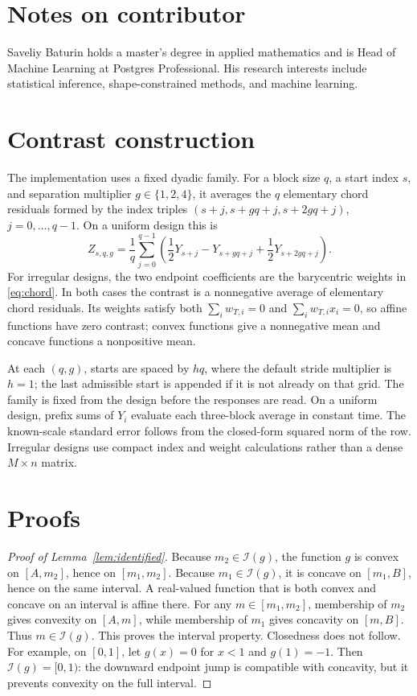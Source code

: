 \documentclass{interact}
\theoremstyle{definition}
\theoremstyle{remark}
\newcommand{\I}{\mathcal{I}}
\begin{document}
\section*{Notes on contributor}

Saveliy Baturin holds a master's degree in applied mathematics and is Head of
Machine Learning at Postgres Professional. His research interests include
statistical inference, shape-constrained methods, and machine learning.

\FloatBarrier



\appendix

\section{Contrast construction}
\label{app:contrasts}

The implementation uses a fixed dyadic family.  For a block size $q$, a start
index $s$, and separation multiplier $g\in\{1,2,4\}$, it averages the $q$
elementary chord residuals formed by the index triples
$(s+j,s+gq+j,s+2gq+j)$, $j=0,\ldots,q-1$.  On a uniform design this is
\[
 Z_{s,q,g}=\frac1q\sum_{j=0}^{q-1}
 \left(\frac12Y_{s+j}-Y_{s+gq+j}+\frac12Y_{s+2gq+j}\right).
\]
For irregular designs, the two endpoint coefficients are the barycentric
weights in \eqref{eq:chord}.  In both cases the contrast is a nonnegative
average of elementary chord residuals.  Its weights satisfy both
$\sum_i w_{T,i}=0$ and $\sum_i w_{T,i}x_i=0$, so
affine functions have zero contrast; convex functions give a nonnegative mean
and concave functions a nonpositive mean.

At each $(q,g)$, starts are spaced by $hq$, where the default stride multiplier
is $h=1$; the last admissible start is appended if it is not already on that
grid.  The family is fixed from the design before the responses are read.  On a
uniform design, prefix sums of $Y_i$ evaluate each three-block average in
constant time.  The known-scale standard error follows from the closed-form
squared norm of the row.  Irregular designs use compact index and weight
calculations rather than a dense $M\times n$ matrix.

\section{Proofs}
\label{app:proofs}

\begin{proof}[Proof of Lemma~\ref{lem:identified}]
Because $m_2\in\I(g)$, the function $g$ is convex on $[A,m_2]$, hence on
$[m_1,m_2]$.  Because $m_1\in\I(g)$, it is concave on $[m_1,B]$, hence on the
same interval.  A real-valued function that is both convex and concave on an
interval is affine there.  For any $m\in[m_1,m_2]$, membership of $m_2$ gives
convexity on $[A,m]$, while membership of $m_1$ gives concavity on $[m,B]$.
Thus $m\in\I(g)$.  This proves the interval property.  Closedness does not
follow.  For example, on $[0,1]$, let $g(x)=0$ for $x<1$ and $g(1)=-1$.
Then $\I(g)=[0,1)$: the downward endpoint jump is compatible with concavity,
but it prevents convexity on the full interval.
\end{proof}
\end{document}
